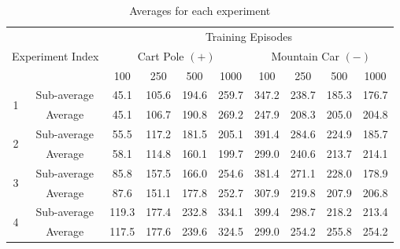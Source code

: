 \documentclass[hidelinks,journal]{IEEEtran}
\begin{document}
\begin{table}[!ht]
  \centering
  \begin{tabular}{| c | c || c | c | c | c || c | c | c | c | }
    \hline
    \multicolumn{2}{|c||}{} & \multicolumn{8}{c|}{Training Episodes} \\ \cline{3-10}
  \multicolumn{2}{|c||}{Experiment Index} & \multicolumn{4}{c||}{Cart Pole $(+)$} & \multicolumn{4}{c|}{Mountain Car $(-)$} \\ \hline
  \multicolumn{2}{|c||}{} & 100 & 250 & 500 & 1000 & 100 & 250 & 500 & 1000 \\ \hline \hline
  \multirow{2}{*}{1} & Sub-average & 45.1 & 105.6 & 194.6 & 259.7 & 347.2 & 238.7 & 185.3 & 176.7 \\
                     & Average & 45.1 & 106.7 & 190.8 & 269.2 & 247.9 & 208.3 & 205.0 & 204.8 \\ \hline 
  \multirow{2}{*}{2} & Sub-average & 55.5 & 117.2 & 181.5 & 205.1 & 391.4 & 284.6 & 224.9 & 185.7 \\
                     & Average & 58.1 & 114.8 & 160.1 & 199.7 & 299.0 & 240.6 & 213.7 & 214.1 \\ \hline 
  \multirow{2}{*}{3} & Sub-average & 85.8 & 157.5 & 166.0 & 254.6 & 381.4 & 271.1 & 228.0 & 178.9 \\
                     & Average & 87.6 & 151.1 & 177.8 & 252.7 & 307.9 & 219.8 & 207.9 & 206.8 \\ \hline 
  \multirow{2}{*}{4} & Sub-average & 119.3 & 177.4 & 232.8 & 334.1 & 399.4 & 298.7 & 218.2 & 213.4 \\
                     & Average & 117.5 & 177.6 & 239.6 & 324.5 & 299.0 & 254.2 & 255.8 & 254.2 \\ \hline 
  \end{tabular}
  \caption{Averages for each experiment}
  \label{tab:results}
\end{table}
\end{document}
